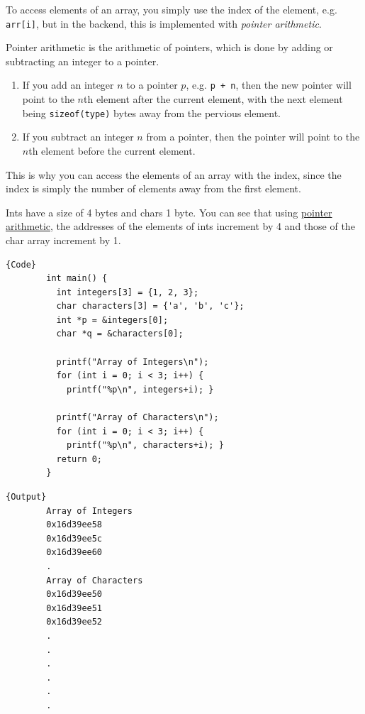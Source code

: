 \documentclass{article}
\newcounter{definition}[section]
\newcounter{example}[section]
\begin{document}
    To access elements of an array, you simply use the index of the element, e.g. \texttt{arr[i]}, but in the backend, this is implemented with \textit{pointer arithmetic}. 

    \begin{definition}
      \label{def:pointer-arithmetic}
      Pointer arithmetic is the arithmetic of pointers, which is done by adding or subtracting an integer to a pointer. 
      \begin{enumerate}
        \item If you add an integer $n$ to a pointer $p$, e.g. \texttt{p + n}, then the new pointer will point to the $n$th element after the current element, with the next element being \texttt{sizeof(type)} bytes away from the pervious element. 
        \item If you subtract an integer $n$ from a pointer, then the pointer will point to the $n$th element before the current element. 
      \end{enumerate}
      This is why you can access the elements of an array with the index, since the index is simply the number of elements away from the first element.
    \end{definition}

    \begin{example}
      \label{ex:pointer-arithmetic-with-arrays-of-ints-and-chars}
      Ints have a size of 4 bytes and chars 1 byte. You can see that using \hyperref[def:pointer-arithmetic]{pointer arithmetic}, the addresses of the elements of ints increment by 4 and those of the char array increment by 1. 
      \noindent\begin{minipage}{.5\textwidth}
      \begin{lstlisting}[]{Code}
        int main() { 
          int integers[3] = {1, 2, 3}; 
          char characters[3] = {'a', 'b', 'c'};
          int *p = &integers[0]; 
          char *q = &characters[0];
          
          printf("Array of Integers\n"); 
          for (int i = 0; i < 3; i++) { 
            printf("%p\n", integers+i); }

          printf("Array of Characters\n"); 
          for (int i = 0; i < 3; i++) { 
            printf("%p\n", characters+i); }
          return 0; 
        }
      \end{lstlisting}
      \end{minipage}
      \hfill
      \begin{minipage}{.49\textwidth}
      \begin{lstlisting}[]{Output}
        Array of Integers
        0x16d39ee58
        0x16d39ee5c
        0x16d39ee60
        .
        Array of Characters
        0x16d39ee50
        0x16d39ee51
        0x16d39ee52
        .
        .
        .
        .
        .
        .
      \end{lstlisting}
      \end{minipage}
    \end{example}
\end{document}
